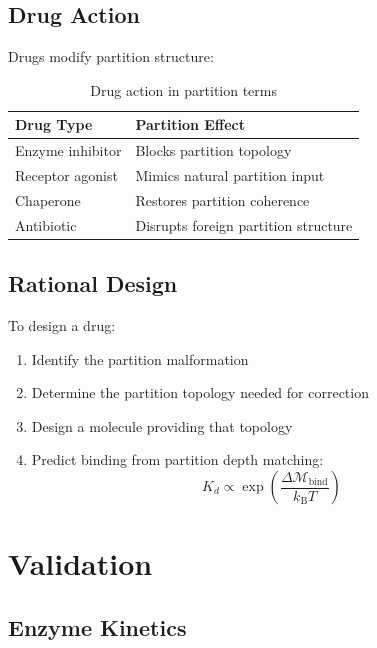 ﻿\documentclass[twocolumn,10pt,a4paper]{article}
\theoremstyle{definition}
\theoremstyle{remark}
\newcommand{\kB}{k_{\mathrm{B}}}
\newcommand{\Depth}{\mathcal{M}}
\begin{document}
\subsection{Drug Action}

Drugs modify partition structure:

\begin{table}[h]
\centering
\caption{Drug action in partition terms}
\label{tab:drugs}
\begin{tabular}{ll}
\toprule
Drug Type & Partition Effect \\
\midrule
Enzyme inhibitor & Blocks partition topology \\
Receptor agonist & Mimics natural partition input \\
Chaperone & Restores partition coherence \\
Antibiotic & Disrupts foreign partition structure \\
\bottomrule
\end{tabular}
\end{table}

\subsection{Rational Design}

To design a drug:
\begin{enumerate}
    \item Identify the partition malformation
    \item Determine the partition topology needed for correction
    \item Design a molecule providing that topology
    \item Predict binding from partition depth matching:
    \begin{equation}
        K_d \propto \exp\left(\frac{\Delta\Depth_{\mathrm{bind}}}{\kB T}\right)
    \end{equation}
\end{enumerate}

\section{Validation}
\label{sec:validation}

\subsection{Enzyme Kinetics}
\end{document}
